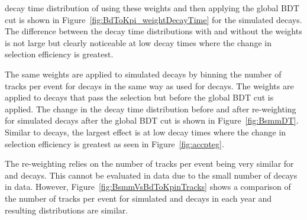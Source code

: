 \noindent decay time distribution of using these weights and then applying the global BDT cut is shown in Figure~\ref{fig:BdToKpi_weightDecayTime} for the simulated \bdkpi decays. The difference between the decay time distributions with and without the weights is not large but clearly noticeable at low decay times where the change in selection efficiency is greatest. 



The same weights are applied to simulated \bsmumu decays by binning the number of tracks per event for \bsmumu decays in the same way as used for \bdkpi decays. The weights are applied to decays that pass the selection but before the global BDT cut is applied. The change in the decay time distribution before and after re-weighting for \bsmumu simulated decays after the global BDT cut is shown in Figure~\ref{fig:BsmmDT}. %
Similar to \bdkpi decays, the largest effect is at low decay times where the change in selection efficiency is greatest as seen in Figure~\ref{fig:accpteg}.

The re-weighting relies on the number of tracks per event being very similar for \bdkpi and \bsmumu decays. This cannot be evaluated in data due to the small number of \bsmumu decays in data. However, Figure~\ref{fig:BsmmVsBdToKpinTracks} shows a comparison of the number of tracks per event for simulated \bsmumu and \bdkpi decays in each year and resulting distributions are similar.


